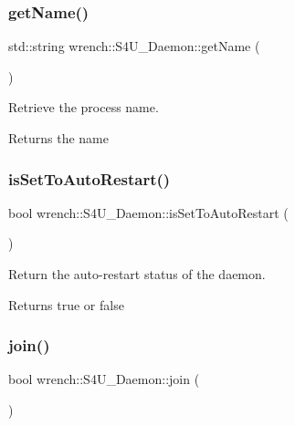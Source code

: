 \subsubsection{\texorpdfstring{get\+Name()}{getName()}}
{\footnotesize\ttfamily std\+::string wrench\+::\+S4\+U\+\_\+\+Daemon\+::get\+Name (\begin{DoxyParamCaption}{ }\end{DoxyParamCaption})}



Retrieve the process name. 

\begin{DoxyReturn}{Returns}
the name 
\end{DoxyReturn}
\mbox{\label{classwrench_1_1_s4_u___daemon_ab500c3fa5bba4bdad7f03def7c6f453a}} 
\subsubsection{\texorpdfstring{is\+Set\+To\+Auto\+Restart()}{isSetToAutoRestart()}}
{\footnotesize\ttfamily bool wrench\+::\+S4\+U\+\_\+\+Daemon\+::is\+Set\+To\+Auto\+Restart (\begin{DoxyParamCaption}{ }\end{DoxyParamCaption})}



Return the auto-\/restart status of the daemon. 

\begin{DoxyReturn}{Returns}
true or false 
\end{DoxyReturn}
\mbox{\label{classwrench_1_1_s4_u___daemon_a0c9fe3246728f52e4d5ae8b1fe9c500f}} 
\subsubsection{\texorpdfstring{join()}{join()}}
{\footnotesize\ttfamily bool wrench\+::\+S4\+U\+\_\+\+Daemon\+::join (\begin{DoxyParamCaption}{ }\end{DoxyParamCaption})}



